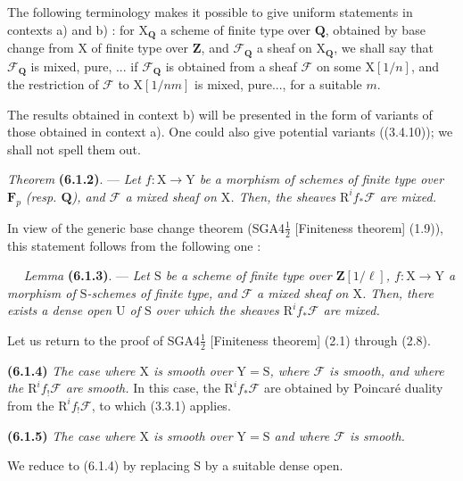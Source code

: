 \documentclass[11pt,leqno]{article}
\newcommand{\Page}[1]{\ifvmode\noindent\else\unskip\ \fi{\footnotesize\textcolor{gray}{[p.\,#1]}}\ \ignorespaces}
\begin{document}
The following terminology makes it possible to give uniform statements in
contexts a) and b) : for \(\mathrm{X}_{\mathbf{Q}}\) a scheme
of finite type over \(\mathbf{Q}\), obtained by base change from
\(\mathrm{X}\) of finite type over \(\mathbf{Z}\), and
\(\mathscr{F}_{\mathbf{Q}}\) a sheaf on \(\mathrm{X}_{\mathbf{Q}}\),
we shall say that \(\mathscr{F}_{\mathbf{Q}}\) is mixed, pure, ... if
\(\mathscr{F}_{\mathbf{Q}}\) is obtained from a sheaf \(\mathscr{F}\)
on some \(\mathrm{X}[1/n]\), and the restriction of \(\mathscr{F}\)
to \(\mathrm{X}[1/nm]\) is mixed, pure..., for a suitable \(m\).

The results obtained in context b) will be presented in the
form of variants of those obtained in context a). One could
also give potential variants ((3.4.10)); we shall not
spell them out.

\textit{Theorem} \textbf{(6.1.2)}. — \textit{Let
\(f:\mathrm{X}\to\mathrm{Y}\) be a morphism of schemes of finite type
over \(\mathbf{F}_p\) (resp. \(\mathbf{Q}\)), and \(\mathscr{F}\) a
mixed sheaf on \(\mathrm{X}\). Then, the sheaves
\(\mathrm{R}^if_*\mathscr{F}\) are mixed.}

In view of the generic base change theorem
(SGA4\(\frac{1}{2}\) [Finiteness theorem] (1.9)), this statement follows from the
following one :

\Page{244}
\textit{Lemma} \textbf{(6.1.3)}. — \textit{Let \(\mathrm{S}\)
be a scheme of finite type over \(\mathbf{Z}[1/\ell]\),
\(f:\mathrm{X}\to\mathrm{Y}\) a morphism of \(\mathrm{S}\)-schemes
of finite type, and \(\mathscr{F}\) a mixed sheaf on \(\mathrm{X}\).
Then, there exists a dense open \(\mathrm{U}\) of \(\mathrm{S}\)
over which the sheaves \(\mathrm{R}^if_*\mathscr{F}\) are
mixed.}

Let us return to the proof of SGA4\(\frac{1}{2}\) [Finiteness theorem]
(2.1) through (2.8).

\textbf{(6.1.4)} \textit{The case where \(\mathrm{X}\) is smooth over
\(\mathrm{Y}=\mathrm{S}\), where \(\mathscr{F}\) is smooth, and where the
\(\mathrm{R}^if_!\mathscr{F}\) are smooth.} In this case, the
\(\mathrm{R}^if_*\mathscr{F}\) are obtained by Poincaré duality
from the \(\mathrm{R}^if_!\mathscr{F}\), to which (3.3.1) applies.

\textbf{(6.1.5)} \textit{The case where \(\mathrm{X}\) is smooth over
\(\mathrm{Y}=\mathrm{S}\) and where \(\mathscr{F}\) is smooth.}

We reduce to (6.1.4) by replacing \(\mathrm{S}\) by a suitable
dense open.
\end{document}
